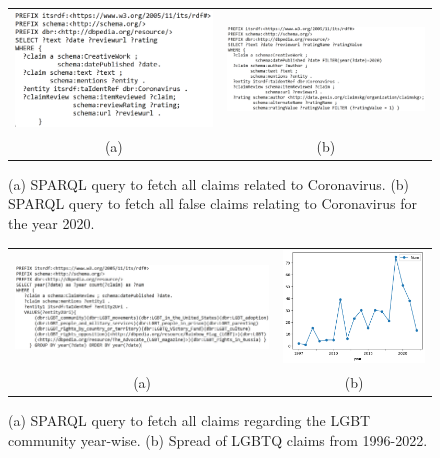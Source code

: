\documentclass[
]{ceurart}
\begin{document}
\vspace{-1mm}
\begin{figure}\begin{tabular}{cc}
     \includegraphics[width=0.40\linewidth]{Table3.PNG}& \includegraphics[width=0.55\linewidth]{test1.PNG} \\
     (a) & (b)  
\end{tabular}
    \caption{(a) SPARQL query to fetch all claims related to Coronavirus. (b) SPARQL query to fetch all false claims relating to Coronavirus for the year 2020.}
    \vspace{-4mm}
    \label{fig:corona}
\end{figure}

\begin{figure}
    \begin{tabular}{cc}
    \includegraphics[width=0.70\linewidth]{test2.PNG} & \includegraphics[width=0.25\linewidth]{lgbt.png} \\
         (a) &  (b)
    \end{tabular}
    \caption{(a) SPARQL query to fetch all claims regarding the LGBT community year-wise. (b)  Spread of LGBTQ claims from 1996-2022.}
    \vspace{-4mm}
    \label{fig:lgtb}
\end{figure}
\end{document}
